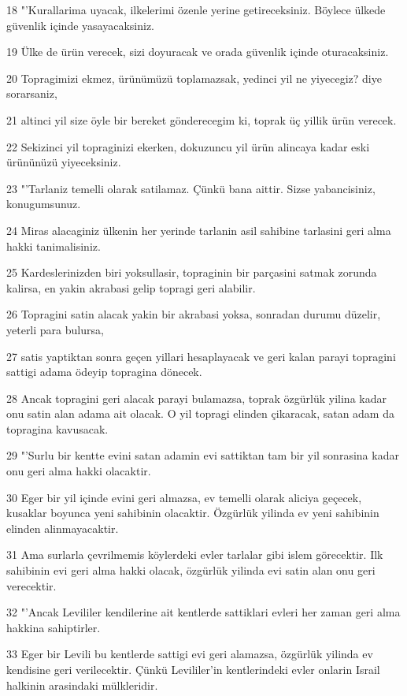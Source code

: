 \par 18 "'Kurallarima uyacak, ilkelerimi özenle yerine getireceksiniz. Böylece ülkede güvenlik içinde yasayacaksiniz.
\par 19 Ülke de ürün verecek, sizi doyuracak ve orada güvenlik içinde oturacaksiniz.
\par 20 Topragimizi ekmez, ürünümüzü toplamazsak, yedinci yil ne yiyecegiz? diye sorarsaniz,
\par 21 altinci yil size öyle bir bereket gönderecegim ki, toprak üç yillik ürün verecek.
\par 22 Sekizinci yil topraginizi ekerken, dokuzuncu yil ürün alincaya kadar eski ürününüzü yiyeceksiniz.
\par 23 "'Tarlaniz temelli olarak satilamaz. Çünkü bana aittir. Sizse yabancisiniz, konugumsunuz.
\par 24 Miras alacaginiz ülkenin her yerinde tarlanin asil sahibine tarlasini geri alma hakki tanimalisiniz.
\par 25 Kardeslerinizden biri yoksullasir, topraginin bir parçasini satmak zorunda kalirsa, en yakin akrabasi gelip topragi geri alabilir.
\par 26 Topragini satin alacak yakin bir akrabasi yoksa, sonradan durumu düzelir, yeterli para bulursa,
\par 27 satis yaptiktan sonra geçen yillari hesaplayacak ve geri kalan parayi topragini sattigi adama ödeyip topragina dönecek.
\par 28 Ancak topragini geri alacak parayi bulamazsa, toprak özgürlük yilina kadar onu satin alan adama ait olacak. O yil topragi elinden çikaracak, satan adam da topragina kavusacak.
\par 29 "'Surlu bir kentte evini satan adamin evi sattiktan tam bir yil sonrasina kadar onu geri alma hakki olacaktir.
\par 30 Eger bir yil içinde evini geri almazsa, ev temelli olarak aliciya geçecek, kusaklar boyunca yeni sahibinin olacaktir. Özgürlük yilinda ev yeni sahibinin elinden alinmayacaktir.
\par 31 Ama surlarla çevrilmemis köylerdeki evler tarlalar gibi islem görecektir. Ilk sahibinin evi geri alma hakki olacak, özgürlük yilinda evi satin alan onu geri verecektir.
\par 32 "'Ancak Levililer kendilerine ait kentlerde sattiklari evleri her zaman geri alma hakkina sahiptirler.
\par 33 Eger bir Levili bu kentlerde sattigi evi geri alamazsa, özgürlük yilinda ev kendisine geri verilecektir. Çünkü Levililer'in kentlerindeki evler onlarin Israil halkinin arasindaki mülkleridir.

